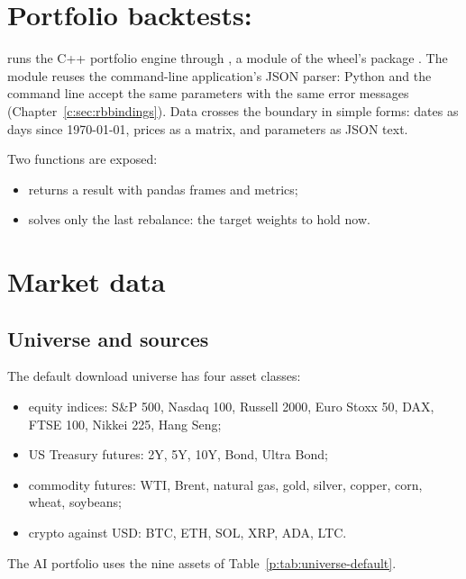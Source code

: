 
\chapter{Portfolio backtests: \texorpdfstring{}{nabia.backtest}}\label{p:sec:bindings}
 runs the C++ portfolio engine through , a module of
the wheel's package . The module reuses the command-line
application's JSON parser: Python and the command line accept the same parameters with the same
error messages (Chapter~\ref{c:sec:rbbindings}). Data crosses the boundary
in simple forms: dates as  days since 1970-01-01, prices as a  matrix,
and parameters as JSON text.

Two functions are exposed:
\begin{itemize}
  \item {} returns a result with
        pandas frames and metrics;
  \item {} solves only the last rebalance: the target weights
        to hold now.
\end{itemize}
\begin{codepointers}
\end{codepointers}



\chapter{Market data}\label{p:sec:marketdata}

\section{Universe and sources}
The default download universe has four asset classes:
\begin{itemize}
  \item equity indices: S\&P 500, Nasdaq 100, Russell 2000, Euro Stoxx 50, DAX, FTSE 100,
        Nikkei 225, Hang Seng;
  \item US Treasury futures: 2Y, 5Y, 10Y, Bond, Ultra Bond;
  \item commodity futures: WTI, Brent, natural gas, gold, silver, copper, corn, wheat,
        soybeans;
  \item crypto against USD: BTC, ETH, SOL, XRP, ADA, LTC.
\end{itemize}
The AI portfolio uses the nine assets of Table~\ref{p:tab:universe-default}.

